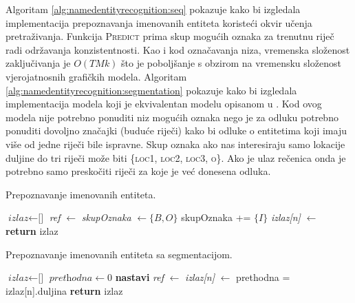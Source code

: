 Algoritam \ref{alg:namedentityrecognition:seq} pokazuje kako bi izgledala
implementacija prepoznavanja imenovanih entiteta koristeći okvir učenja
pretraživanja. Funkcija \textsc{Predict} prima skup mogućih oznaka za trenutnu
riječ radi održavanja konzistentnosti. Kao i kod označavanja niza, vremenska
složenost zaključivanja je $O(T M k)$ što je poboljšanje s obzirom na vremensku
složenost vjerojatnosnih grafičkih modela. Algoritam
\ref{alg:namedentityrecognition:segmentation} pokazuje kako bi izgledala
implementacija modela koji je ekvivalentan modelu opisanom u
\citep{sarawagi2004semi}. Kod ovog modela nije potrebno ponuditi niz mogućih
oznaka nego je za odluku potrebno ponuditi dovoljno značajki (buduće riječi)
kako bi odluke o entitetima koji imaju više od jedne riječi bile ispravne. Skup
oznaka ako nas interesiraju samo lokacije duljine do tri riječi može biti
\{\textsc{loc1}, \textsc{loc2}, \textsc{loc3}, \textsc{o}\}. Ako je ulaz
rečenica onda je potrebno samo preskočiti riječi za koje je već donesena odluka.

\begin{algorithm}[H]
\caption{Prepoznavanje imenovanih entiteta.}
\label{alg:namedentityrecognition:seq}
\begin{algorithmic}[1]
\State $\textit{izlaz} \gets \text{[]}$
  \State \textit{ref} $\gets$ 
  \State \textit{skupOznaka} $\gets \{B,O\}$
    \State skupOznaka += $\{I\}$
  \EndIf
  \State \textit{izlaz[n]} $\gets$ 
\EndFor
\State {}
\State \textbf{return} izlaz
\EndFunction
\end{algorithmic}
\end{algorithm}

\begin{algorithm}[H]
\caption{Prepoznavanje imenovanih entiteta sa segmentacijom.}
\label{alg:namedentityrecognition:segmentation}
\begin{algorithmic}[1]
\State $\textit{izlaz} \gets \text{[]}$
\State $\textit{prethodna} \gets 0$
    \State \textbf{nastavi} 
  \EndIf
  \State \textit{ref} $\gets$ 
  \State \textit{izlaz[n]} $\gets$ 
  \State prethodna = izlaz[n].duljina
\EndFor
\State {}
\State \textbf{return} izlaz
\EndFunction
\end{algorithmic}
\end{algorithm}
